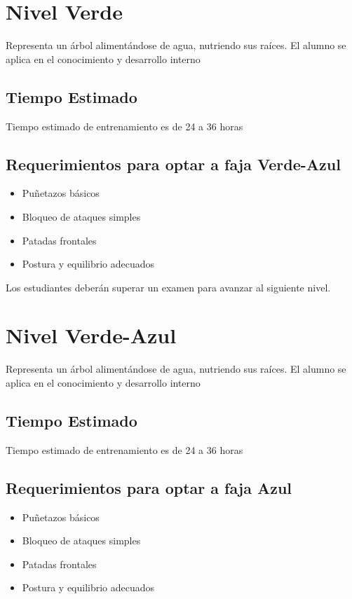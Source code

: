 \section{Nivel Verde}

Representa un árbol alimentándose de agua, nutriendo sus raíces. El alumno se aplica en el conocimiento y desarrollo interno

\subsection[Duración]{Tiempo Estimado}

Tiempo estimado de entrenamiento es de 24 a 36 horas

\subsection{Requerimientos para optar a faja Verde-Azul}

\begin{itemize}
	\item Puñetazos básicos
	\item Bloqueo de ataques simples
	\item Patadas frontales
	\item Postura y equilibrio adecuados
\end{itemize}

Los estudiantes deberán superar un examen para avanzar al siguiente nivel.

\section{Nivel Verde-Azul}

Representa un árbol alimentándose de agua, nutriendo sus raíces. El alumno se aplica en el conocimiento y desarrollo interno

\subsection[Duración]{Tiempo Estimado}

Tiempo estimado de entrenamiento es de 24 a 36 horas

\subsection{Requerimientos para optar a faja Azul}

\begin{itemize}
	\item Puñetazos básicos
	\item Bloqueo de ataques simples
	\item Patadas frontales
	\item Postura y equilibrio adecuados
\end{itemize}


